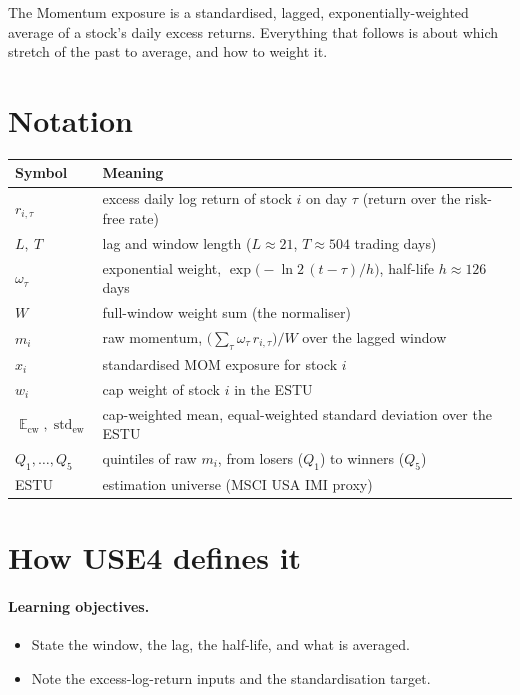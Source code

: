 \documentclass[11pt]{article}
\theoremstyle{definition}
\theoremstyle{plain}
\theoremstyle{remark}
\DeclareMathOperator{\std}{std}
\DeclareMathOperator*{\avg}{\mathbb{E}}
\begin{document}
\begin{keyresult}
The Momentum exposure is a standardised, lagged, exponentially-weighted average of a stock's daily excess returns. Everything that follows is about which stretch of the past to average, and how to weight it.
\end{keyresult}

\section*{Notation}

\begin{center}
\begin{tabular}{@{}ll@{}}
\toprule
Symbol & Meaning \\
\midrule
$r_{i,\tau}$ & excess daily log return of stock $i$ on day $\tau$ (return over the risk-free rate) \\
$L,\ T$ & lag and window length ($L\approx 21$, $T\approx 504$ trading days) \\
$\omega_\tau$ & exponential weight, $\exp\!\big(-\ln 2\,(t-\tau)/h\big)$, half-life $h\approx 126$ days \\
$W$ & full-window weight sum (the normaliser) \\
$m_i$ & raw momentum, $\big(\textstyle\sum_\tau \omega_\tau\, r_{i,\tau}\big)/W$ over the lagged window \\
$x_i$ & standardised MOM exposure for stock $i$ \\
$w_i$ & cap weight of stock $i$ in the ESTU \\
$\avg_{\text{cw}}, \std_{\text{ew}}$ & cap-weighted mean, equal-weighted standard deviation over the ESTU \\
$Q_1,\dots,Q_5$ & quintiles of raw $m_i$, from losers ($Q_1$) to winners ($Q_5$) \\
ESTU & estimation universe (MSCI USA IMI proxy) \\
\bottomrule
\end{tabular}
\end{center}

\section{How USE4 defines it}\label{sec:def}

\paragraph{Learning objectives.}
\begin{itemize}[leftmargin=1.4em,topsep=2pt]
  \item State the window, the lag, the half-life, and what is averaged.
  \item Note the excess-log-return inputs and the standardisation target.
\end{itemize}
\end{document}
